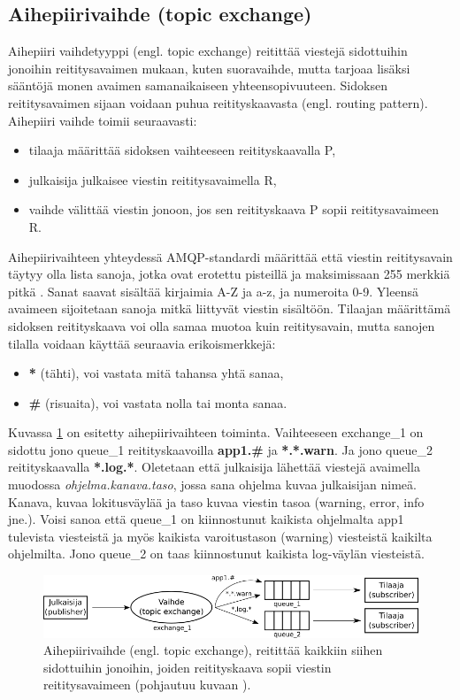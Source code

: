 \subsection{Aihepiirivaihde (topic exchange)}
Aihepiiri vaihdetyyppi (engl. topic exchange) reitittää viestejä sidottuihin jonoihin reititysavaimen mukaan, kuten suoravaihde, mutta tarjoaa lisäksi sääntöjä monen avaimen samanaikaiseen yhteensopivuuteen. Sidoksen reititysavaimen sijaan voidaan puhua reitityskaavasta (engl. routing pattern). Aihepiiri vaihde toimii seuraavasti:
\begin{itemize}
	\item tilaaja määrittää sidoksen vaihteeseen reitityskaavalla P,
	\item julkaisija julkaisee viestin reititysavaimella R,
	\item vaihde välittää viestin jonoon, jos sen reitityskaava P sopii reititysavaimeen R.
\end{itemize}
Aihepiirivaihteen yhteydessä AMQP-standardi määrittää että viestin reititysavain täytyy olla lista sanoja, jotka ovat erotettu pisteillä ja maksimissaan 255 merkkiä pitkä \cite[s.~35]{AMQP-specification}. Sanat saavat sisältää kirjaimia A-Z ja a-z, ja numeroita 0-9. Yleensä avaimeen sijoitetaan sanoja mitkä liittyvät viestin sisältöön. Tilaajan määrittämä sidoksen reitityskaava voi olla samaa muotoa kuin reititysavain, mutta sanojen tilalla voidaan käyttää seuraavia erikoismerkkejä:
\begin{itemize}
	\item \textbf{*} (tähti), voi vastata mitä tahansa yhtä sanaa,
	\item \textbf{\#} (risuaita), voi vastata nolla tai monta sanaa. \cite[s.~27]{AMQP-specification}
\end{itemize}

Kuvassa \ref{fig:amqp-topic-exchange} on esitetty aihepiirivaihteen toiminta. Vaihteeseen exchange\_1 on sidottu jono queue\_1 reitityskaavoilla \textbf{app1.\#} ja \textbf{*.*.warn}. Ja jono queue\_2 reitityskaavalla \textbf{*.log.*}. Oletetaan että julkaisija lähettää viestejä avaimella muodossa \emph{ohjelma.kanava.taso}, jossa sana ohjelma kuvaa julkaisijan nimeä. Kanava, kuvaa lokitusväylää ja taso kuvaa viestin tasoa (warning, error, info jne.). Voisi sanoa että queue\_1 on kiinnostunut kaikista ohjelmalta app1 tulevista viesteistä ja myös kaikista varoitustason (warning) viesteistä kaikilta ohjelmilta. Jono queue\_2 on taas kiinnostunut kaikista log-väylän viesteistä.

\begin{figure}[ht!]
	\includegraphics[width=1\textwidth]{pictures/amqp-topic-exchange.png}
	\caption{Aihepiirivaihde (engl. topic exchange), reitittää kaikkiin siihen sidottuihin jonoihin, joiden reitityskaava sopii viestin reititysavaimeen (pohjautuu kuvaan \cite{RabbitMQ-Tutorial-Topics}).}
	\label{fig:amqp-topic-exchange}
\end{figure}

